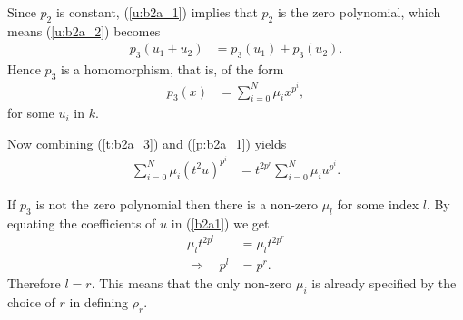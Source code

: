 										Since $p_2$ is constant, (\ref{u:b2a_1}) implies that $p_2$ is the zero polynomial, which means (\ref{u:b2a_2}) becomes
										\begin{align*}
										p_3(u_1 + u_2) &= p_3(u_1) + p_3(u_2). 
										\end{align*}
										Hence $p_3$ is a homomorphism, that is, of the form
										\begin{align}
										\label{p:b2a_1}
										p_3(x) &= \sum_{i=0}^N \mu_i x^{p^i},
										\end{align}
										for some $u_i$ in $k$.

										Now combining (\ref{t:b2a_3}) and (\ref{p:b2a_1}) yields
										\begin{align}
										\label{b2a1}
										\sum_{i=0}^N \mu_i (t^2u)^{p^i} &= t^{2p^r}\sum_{i=0}^N \mu_i u^{p^i}.
										\end{align}

										If $p_3$ is not the zero polynomial then there is a non-zero $\mu_l$ for some index $l$. By equating the coefficients of $u$ in (\ref{b2a1}) we get
										\begin{align*}
										\mu_lt^{2p^l} &= \mu_lt^{2p^r} \\
											\Longrightarrow\quad p^l &= p^r.
											\end{align*}
											Therefore $l=r$. This means that the only non-zero $\mu_i$ is already specified by the choice of $r$ in defining $\rho_r$. 

